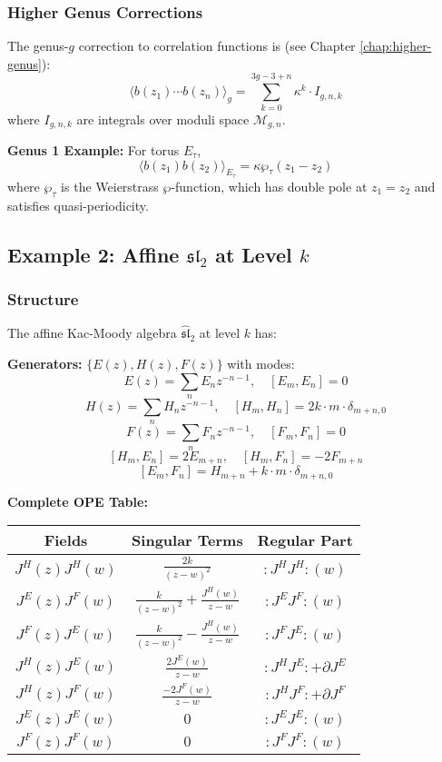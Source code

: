 \subsubsection{Higher Genus Corrections}

The genus-$g$ correction to correlation functions is (see Chapter \ref{chap:higher-genus}):
$$\langle b(z_1) \cdots b(z_n) \rangle_g = \sum_{k=0}^{3g-3+n} \kappa^k \cdot I_{g,n,k}$$
where $I_{g,n,k}$ are integrals over moduli space $\mathcal{M}_{g,n}$.

\textbf{Genus 1 Example:} For torus $E_\tau$,
$$\langle b(z_1)b(z_2) \rangle_{E_\tau} = \kappa \wp_\tau(z_1 - z_2)$$
where $\wp_\tau$ is the Weierstrass $\wp$-function, which has double pole at $z_1 = z_2$ and satisfies quasi-periodicity.

\subsection{Example 2: Affine $\widehat{\mathfrak{sl}}_2$ at Level $k$}
\label{subsec:affine-sl2-complete}

\subsubsection{Structure}

The affine Kac-Moody algebra $\widehat{\mathfrak{sl}}_2$ at level $k$ \cite{Kac, FBZ04} has:

\textbf{Generators:} $\{E(z), H(z), F(z)\}$ with modes:
$$E(z) = \sum_n E_n z^{-n-1}, \quad [E_m, E_n] = 0$$
$$H(z) = \sum_n H_n z^{-n-1}, \quad [H_m, H_n] = 2k \cdot m \cdot \delta_{m+n,0}$$
$$F(z) = \sum_n F_n z^{-n-1}, \quad [F_m, F_n] = 0$$
$$[H_m, E_n] = 2E_{m+n}, \quad [H_m, F_n] = -2F_{m+n}$$
$$[E_m, F_n] = H_{m+n} + k \cdot m \cdot \delta_{m+n,0}$$

\textbf{Complete OPE Table:}
\begin{center}
\begin{tabular}{|c|c|c|}
\hline
\textbf{Fields} & \textbf{Singular Terms} & \textbf{Regular Part} \\
\hline
$J^H(z)J^H(w)$ & $\displaystyle\frac{2k}{(z-w)^2}$ & $:\!J^HJ^H\!:(w)$ \\
\hline
$J^E(z)J^F(w)$ & $\displaystyle\frac{k}{(z-w)^2} + \frac{J^H(w)}{z-w}$ & $:\!J^EJ^F\!:(w)$ \\
\hline
$J^F(z)J^E(w)$ & $\displaystyle\frac{k}{(z-w)^2} - \frac{J^H(w)}{z-w}$ & $:\!J^FJ^E\!:(w)$ \\
\hline
$J^H(z)J^E(w)$ & $\displaystyle\frac{2J^E(w)}{z-w}$ & $:\!J^HJ^E\!: + \partial J^E$ \\
\hline
$J^H(z)J^F(w)$ & $\displaystyle\frac{-2J^F(w)}{z-w}$ & $:\!J^HJ^F\!: + \partial J^F$ \\
\hline
$J^E(z)J^E(w)$ & $0$ & $:\!J^EJ^E\!:(w)$ \\
\hline
$J^F(z)J^F(w)$ & $0$ & $:\!J^FJ^F\!:(w)$ \\
\hline
\end{tabular}
\end{center}

